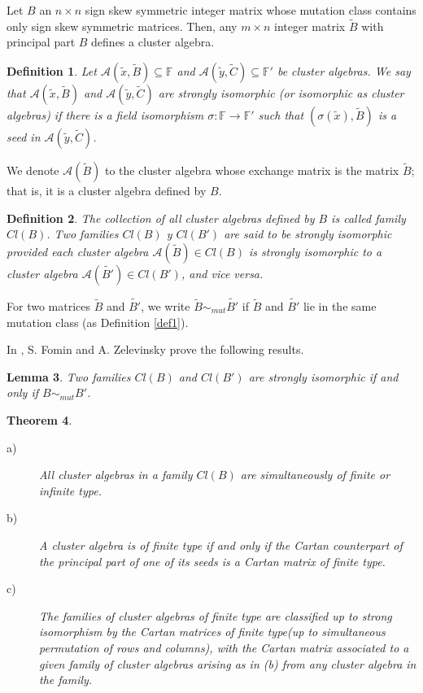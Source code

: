 \documentclass[12pt,a4paper]{article}
\newtheorem{Theorem}{Theorem}[section]
\newtheorem{Lemma}[Theorem]{Lemma}
\newtheorem{definition}[Theorem]{Definition}
\begin{document}
Let $B$ an $n \times n$ sign skew symmetric integer matrix whose mutation class contains only sign skew symmetric matrices. Then, any $m \times n$ integer matrix $\tilde{B}$ with principal part $B$ defines a cluster algebra. 

\begin{definition}
Let $\mathcal{A}(\tilde{x},\tilde{B})\subseteq \mathbb{F}$ and $\mathcal{A}(\tilde{y},\tilde{C})\subseteq \mathbb{F}'$ be cluster algebras. We say that $\mathcal{A}(\tilde{x},\tilde{B})$ and $\mathcal{A}(\tilde{y},\tilde{C})$ are strongly isomorphic (or isomorphic as cluster algebras) if there is a field isomorphism $\sigma : \mathbb{F}\rightarrow\mathbb{F}'$ such that $(\sigma(\tilde{x}),\tilde{B})$ is a seed in $\mathcal{A}(\tilde{y},\tilde{C})$. 
\label{def12}
\end{definition}
We denote $\mathcal{A}(\tilde{B})$ to the cluster algebra whose exchange matrix is the matrix $\tilde{B}$; that is, it is a cluster algebra defined by $B$.

\begin{definition}
The collection of all cluster algebras defined by $B$ is called family $Cl(B)$. Two families $Cl(B)$ y $Cl(B')$ are said to be strongly isomorphic provided each cluster algebra $\mathcal{A}(\tilde{B}) \in Cl(B)$ is strongly isomorphic to a cluster algebra $\mathcal{A}(\tilde{B'}) \in Cl(B')$, and vice versa.  
\end{definition}

For two matrices $\tilde{B}$ and $\tilde{B'}$, we write $\tilde{B} \sim_{mut} \tilde{B'}$ if $\tilde{B}$ and $\tilde{B'}$  lie in the same mutation class (as Definition \ref{def1}).

In \cite{fominfinito}, S. Fomin and A. Zelevinsky prove the following results.

\begin{Lemma}
Two families $Cl(B)$ and $Cl(B')$ are strongly isomorphic if and only if $B\sim_{mut} B'$.
\end{Lemma}

\begin{Theorem}

\begin{description}
\item[a)] All cluster algebras in a family $Cl(B)$ are simultaneously of finite or infinite type.
\item[b)] A cluster algebra is of finite type if and only if the Cartan counterpart of the principal part of one of its seeds is a Cartan matrix of finite type.
\item[c)] The families of cluster algebras of finite type are classified up to strong isomorphism by the Cartan matrices of finite type(up to simultaneous permutation of rows and columns), with the Cartan matrix associated to a given family of cluster algebras arising as in (b) from any cluster algebra in the family.
\end{description}
\label{teo1}
\end{Theorem}
\end{document}
